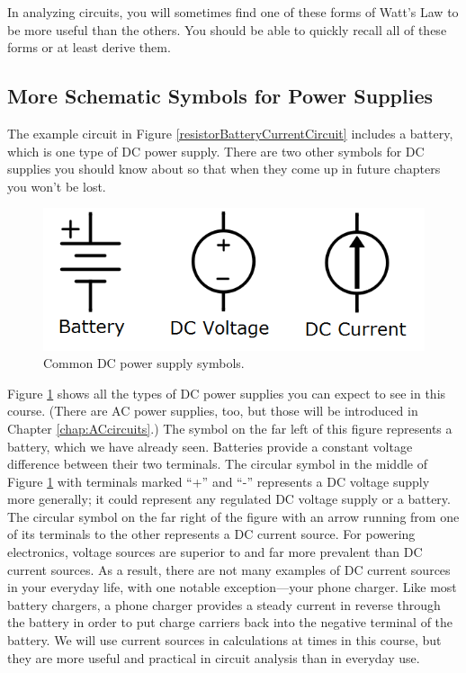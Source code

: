 In analyzing circuits, you will sometimes find one of these forms of Watt's Law to be more useful than the others. You should be able to quickly recall all of these forms or at least derive them.
\subsection{More Schematic Symbols for Power Supplies}
The example circuit in Figure \ref{resistorBatteryCurrentCircuit} includes a battery, which is one type of DC power supply. There are two other symbols for DC supplies you should know about so that when they come up in future chapters you won't be lost. 
\begin{figure}[h!]
\centering
\includegraphics{figures/DCpowerSupplies.png}
\caption{Common DC power supply symbols.}
\label{DCpowerSupplies}
\end{figure}
\par
Figure \ref{DCpowerSupplies} shows all the types of DC power supplies you can expect to see in this course. (There are AC power supplies, too, but those will be introduced in Chapter \ref{chap:ACcircuits}.) The symbol on the far left of this figure represents a battery, which we have already seen. Batteries provide a constant voltage difference between their two terminals. The circular symbol in the middle of Figure \ref{DCpowerSupplies} with terminals marked ``+'' and ``-'' represents a DC voltage supply more generally; it could represent any regulated DC voltage supply or a battery. The circular symbol on the far right of the figure with an arrow running from one of its terminals to the other represents a DC current source. For powering electronics, voltage sources are superior to and far more prevalent than DC current sources. As a result, there are not many examples of DC current sources in your everyday life, with one notable exception---your phone charger. Like most battery chargers, a phone charger provides a steady current in reverse through the battery in order to put charge carriers back into the negative terminal of the battery. We will use current sources in calculations at times in this course, but they are more useful and practical in circuit analysis than in everyday use.

